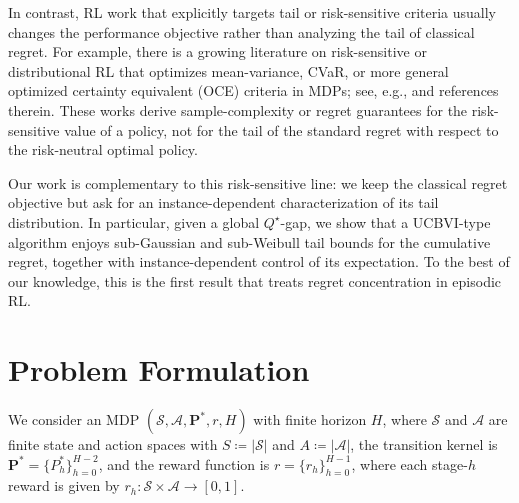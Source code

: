 \documentclass[11pt]{article}
\newcommand{\pp}{\boldsymbol{P}}
\begin{document}
In contrast, RL work that explicitly targets tail or risk-sensitive criteria usually changes the performance objective rather than analyzing the tail of classical regret.  
For example, there is a growing literature on risk-sensitive or distributional RL that optimizes mean-variance, CVaR, or more general optimized certainty equivalent (OCE) criteria in MDPs; see, e.g., \citet{tamar2015optimizing,chow2015risk,xu2023regret} and references therein.  
These works derive sample-complexity or regret guarantees for the risk-sensitive value of a policy, not for the tail of the standard regret with respect to the risk-neutral optimal policy.  

Our work is complementary to this risk-sensitive line: we keep the classical regret objective but ask for an instance-dependent characterization of its tail distribution.  
In particular, given a global $Q^\star$-gap, we show that a UCBVI-type algorithm enjoys sub-Gaussian and sub-Weibull tail bounds for the cumulative regret, together with instance-dependent control of its expectation.  
To the best of our knowledge, this is the first result that treats regret concentration in episodic RL.

\section{Problem Formulation}

We consider an MDP $(\mathcal{S},\mathcal{A},\pp^*,r,H)$ with finite horizon $H$, where $\mathcal S$ and $\mathcal A$ are finite state and action spaces with $S \coloneqq |\mathcal{S}|$ and $A \coloneqq |\mathcal{A}|$, the transition kernel is $\pp^* = \{P_h^*\}_{h=0}^{H-2}$, and the reward function is $r = \{r_h\}_{h=0}^{H-1}$, where each stage-$h$ reward is given by $r_h : \mathcal S \times \mathcal A \to [0,1]$. 
\end{document}
